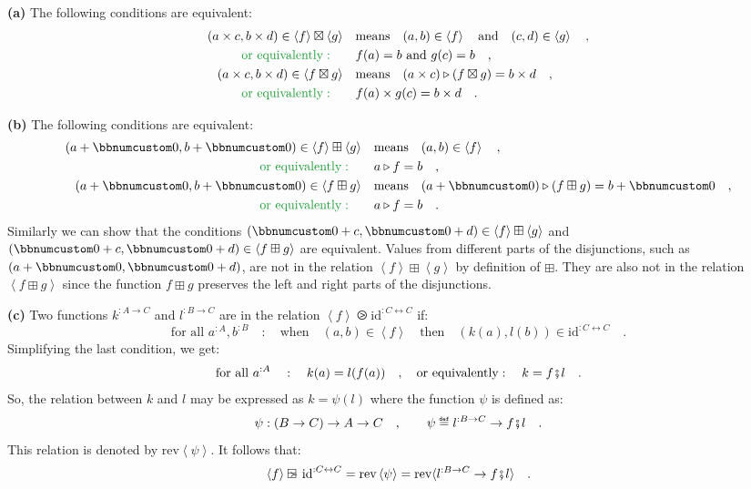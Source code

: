 \textbf{(a)} The following conditions are equivalent:
\begin{align*}
(a\times c,b\times d)\in\left<f\right>\boxtimes\left<g\right> & \quad\text{means}\quad(a,b)\in\left<f\right>\quad\text{and}\quad(c,d)\in\left<g\right>\quad,\\
{\color{greenunder}\text{or equivalently}:}\quad & \quad f(a)=b\text{ and }g(c)=b\quad,\\
(a\times c,b\times d)\in\left<f\boxtimes g\right> & \quad\text{means}\quad(a\times c)\triangleright(f\boxtimes g)=b\times d\quad,\\
{\color{greenunder}\text{or equivalently}:}\quad & \quad f(a)\times g(c)=b\times d\quad.
\end{align*}

\textbf{(b)} The following conditions are equivalent:
\begin{align*}
(a+\bbnum 0,b+\bbnum 0)\in\left<f\right>\boxplus\left<g\right> & \quad\text{means}\quad(a,b)\in\left<f\right>\quad,\\
{\color{greenunder}\text{or equivalently}:}\quad & \quad a\triangleright f=b\quad,\\
(a+\bbnum 0,b+\bbnum 0)\in\left<f\boxplus g\right> & \quad\text{means}\quad(a+\bbnum 0)\triangleright(f\boxplus g)=b+\bbnum 0\quad,\\
{\color{greenunder}\text{or equivalently}:}\quad & \quad a\triangleright f=b\quad.
\end{align*}
Similarly we can show that the conditions $(\bbnum 0+c,\bbnum 0+d)\in\left<f\right>\boxplus\left<g\right>$
and $(\bbnum 0+c,\bbnum 0+d)\in\left<f\boxplus g\right>$ are equivalent.
Values from different parts of the disjunctions, such as $(a+\bbnum 0,\bbnum 0+d)$,
are not in the relation $\left<f\right>\boxplus\left<g\right>$ by
definition of $\boxplus$. They are also not in the relation $\left<f\boxplus g\right>$
since the function $f\boxplus g$ preserves the left and right parts
of the disjunctions.

\textbf{(c)} Two functions $k^{:A\rightarrow C}$ and $l^{:B\rightarrow C}$
are in the relation $\left<f\right>\ogreaterthan\text{id}^{:C\leftrightarrow C}$
if:
\[
\text{for all }a^{:A},b^{:B}\quad:\quad\text{when}\quad(a,b)\in\left<f\right>\quad\text{then}\quad(k(a),l(b))\in\text{id}^{:C\leftrightarrow C}\quad.
\]
Simplifying the last condition, we get:
\[
\text{for all }a^{:A}\quad:\quad k(a)=l(f(a))\quad,\quad\text{or equivalently}:\quad k=f\bef l\quad.
\]
So, the relation between $k$ and $l$ may be expressed as $k=\psi(l)$
where the function $\psi$ is defined as:
\[
\psi:\left(B\rightarrow C\right)\rightarrow A\rightarrow C\quad,\quad\quad\psi\triangleq l^{:B\rightarrow C}\rightarrow f\bef l\quad.
\]
This relation is denoted by $\text{rev}\left<\psi\right>$. It follows
that: 
\[
\left<f\right>\ogreaterthan\text{id}^{:C\leftrightarrow C}=\text{rev}\left<\psi\right>=\text{rev}\langle l^{:B\rightarrow C}\rightarrow f\bef l\rangle\quad.
\]

